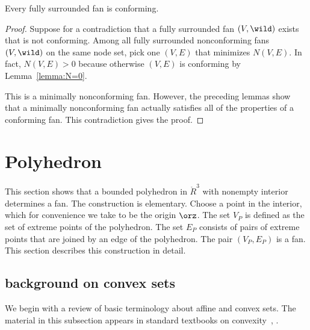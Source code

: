 %


\begin{lemma}[conformance]\label{lemma:face}
Every fully surrounded fan is conforming.
\end{lemma}

\begin{proof}
Suppose for a contradiction that a fully surrounded fan $(V,\wild )$
exists that is not conforming.  Among all fully surrounded
nonconforming fans $(V,\wild )$ on the same node set, pick one $(V,E)$
that minimizes $N(V,E)$.  In fact, $N(V,E)>0$ because otherwise $(V,E)$
is conforming by Lemma~\ref{lemma:N=0}.

This is a minimally nonconforming fan.  However, the preceding lemmas show
that a minimally nonconforming fan actually satisfies all of the properties
of a conforming fan.   This contradiction gives the proof.
\end{proof}



\section{Polyhedron}\label{sec:poly}

This section shows that a bounded polyhedron in $\ring{R}^3$ with
nonempty interior determines a fan.  The construction is elementary.
Choose a point in the interior, which for convenience we take to be
the origin $\orz$.  The set $V_P$ is defined as the set of extreme
points of the polyhedron.  The set $E_P$ consists of pairs of extreme
points that are joined by an edge of the polyhedron.  The pair
$(V_P,E_P)$ is a fan.  This section describes this construction in
 detail.



\subsection{background on convex sets}

We begin with a review of basic terminology about affine and convex
sets.  The material in this subsection appears in standard textbooks
on convexity~\cite{barvinok:2002}, \cite{webster:1994}.

